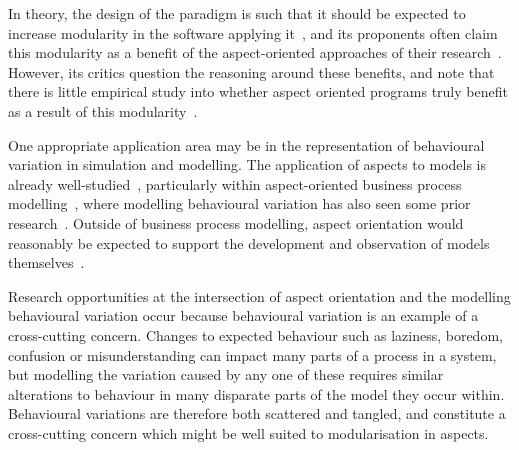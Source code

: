 In theory, the design of the paradigm is such that it should be expected to
increase modularity in the software applying
it~\cite{kiczales1997aspect,filman2000aspect}, and its
proponents often claim this modularity as a benefit of the aspect-oriented
approaches of their
research~\cite{gilani2004family,charfi2007ao4bpel,Cappelli_AOBPM,jalali2012aspect,chibani2013toward}.
However, its critics question the reasoning around these benefits, and note that
there is little empirical study into whether aspect oriented programs truly
benefit as a result of this
modularity~\cite{Constantinides04aopconsidered,steimann06paradoxical,przybylek2010wrong}.

One appropriate application area may be in the representation of behavioural
variation in simulation and modelling. The application of aspects to models is
already well-studied~\cite{DEVSaspectorientation2008aksu,chibani2013toward},
particularly within aspect-oriented business process
modelling~\cite{charfi2007ao4bpel,Cappelli_AOBPM,jalali2012aspect}, where
modelling behavioural variation has also seen some prior
research~\cite{Machado_2011,stocker2013secsy,pourmasoumi2015business,ExecutableBPMNMitsyuk}. 
Outside of business process modelling, aspect orientation would reasonably be
expected to support the development and observation of models
themselves~\cite{gulyas1999use}. 

Research opportunities at the intersection of aspect orientation and the
modelling behavioural variation occur because behavioural variation is an
example of a cross-cutting concern. Changes to expected behaviour such as
laziness, boredom, confusion or misunderstanding can impact many parts of a
process in a \sociotechnical system, but modelling the variation caused by any
one of these requires similar alterations to behaviour in many
disparate parts of the model they occur within. Behavioural variations are
therefore both scattered and tangled, and constitute a cross-cutting concern
which might be well suited to modularisation in aspects.

